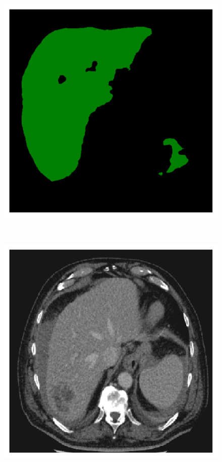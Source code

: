 {\begin{figure}[!ht]
\begin{mdframed}[backgroundcolor=blue!50,linecolor=blue!50]
\begin{minipage}{4cm}
	\end{minipage} \hspace{-0.3cm}
	\begin{minipage}{4cm}
		\includegraphics[width=\linewidth]{images/LiverVE_Pred_Pat0_3}
	\end{minipage} \\
	\begin{minipage}{4cm}
		\includegraphics[width=\linewidth]{images/LiverVE_Raw_Pat4_5}

\end{minipage}
\end{mdframed}
\end{figure}}

